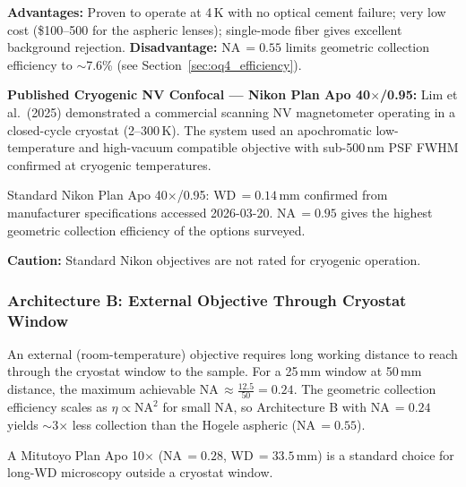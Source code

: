 \textbf{Advantages:} Proven to operate at 4\,K with no optical cement failure;
very low cost (\$100--500 for the aspheric lenses); single-mode fiber gives
excellent background rejection.\cite{Hogele2008}
\textbf{Disadvantage:} NA\,$= 0.55$ limits geometric collection efficiency
to $\sim$7.6\% (see Section~\ref{sec:oq4_efficiency}).

\textbf{Published Cryogenic NV Confocal --- Nikon Plan Apo 40$\times$/0.95:}
Lim et al.\ (2025) demonstrated a commercial scanning NV magnetometer
operating in a closed-cycle cryostat (2--300\,K).\cite{arXiv2502.16599}
The system used an apochromatic low-temperature and high-vacuum compatible
objective with sub-500\,nm PSF FWHM confirmed at cryogenic
temperatures.\cite{arXiv2502.16599}

Standard Nikon Plan Apo 40$\times$/0.95: WD\,$= 0.14$\,mm confirmed from
manufacturer specifications accessed 2026-03-20.\cite{NikonPlanApo_web}
NA\,$= 0.95$ gives the highest geometric collection efficiency of the options
surveyed.

\textbf{Caution:} Standard Nikon objectives are not rated for cryogenic
operation. 

\subsubsection{Architecture B: External Objective Through Cryostat Window}

An external (room-temperature) objective requires long working distance to
reach through the cryostat window to the sample. For a 25\,mm window at
50\,mm distance, the maximum achievable NA\,$\approx
\frac{12.5}{50} = 0.24$. The geometric collection efficiency scales as
$\eta \propto \mathrm{NA}^2$ for small NA, so Architecture B with NA\,$= 0.24$
yields $\sim$3$\times$ less collection than the Hogele aspheric (NA\,$= 0.55$).


A Mitutoyo Plan Apo 10$\times$ (NA\,$= 0.28$, WD\,$= 33.5$\,mm)
is a standard choice for long-WD microscopy outside a cryostat window.

